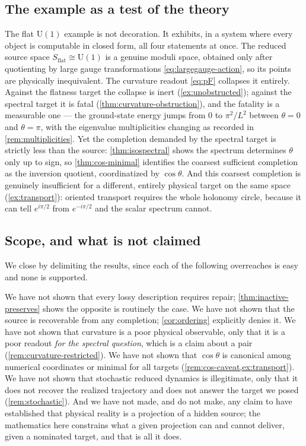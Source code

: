 \documentclass[11pt,reqno]{amsart}
\theoremstyle{plain}
\theoremstyle{definition}
\newcommand{\Uone}{\mathrm{U}(1)}
\newcommand{\Src}{S}
\begin{document}
\subsection{The example as a test of the theory}

The flat $\Uone$ example is not decoration. It exhibits, in a system where every object is
computable in closed form, all four statements at once. The reduced source space
$\Src_{\mathrm{flat}}\cong\Uone$ is a genuine moduli space, obtained only after quotienting by
large gauge transformations \eqref{eq:largegauge-action}, so its points are physically
inequivalent. The curvature readout \eqref{eq:pF} collapses it entirely. Against the flatness
target the collapse is inert (\cref{ex:unobstructed}); against the spectral target it is fatal
(\cref{thm:curvature-obstruction}), and the fatality is a measurable one --- the ground-state
energy jumps from $0$ to $\pi^2/L^2$ between $\theta=0$ and $\theta=\pi$, with the eigenvalue
multiplicities changing as recorded in \cref{rem:multiplicities}. Yet the completion demanded by
the spectral target is strictly less than the source: \cref{thm:isospectral} shows the spectrum
determines $\theta$ only up to sign, so \cref{thm:cos-minimal} identifies the coarsest sufficient
completion as the inversion quotient, coordinatized by $\cos\theta$. And this coarsest completion
is genuinely insufficient for a different, entirely physical target on the same space
(\cref{ex:transport}): oriented transport requires the whole holonomy circle, because it can tell
$e^{i\pi/2}$ from $e^{-i\pi/2}$ and the scalar spectrum cannot.

\subsection{Scope, and what is not claimed}

We close by delimiting the results, since each of the following overreaches is easy and none is
supported.

We have not shown that every lossy description requires repair; \cref{thm:inactive-preserves}
shows the opposite is routinely the case. We have not shown that the source is recoverable from
any completion; \cref{cor:ordering} explicitly denies it. We have not shown that curvature is a
poor physical observable, only that it is a poor readout \emph{for the spectral question}, which
is a claim about a pair (\cref{rem:curvature-restricted}). We have not shown that $\cos\theta$ is
canonical among numerical coordinates or minimal for all targets
(\cref{rem:cos-caveat,ex:transport}). We have not shown that stochastic reduced dynamics is
illegitimate, only that it does not recover the realized trajectory and does not answer the target
we posed (\cref{rem:stochastic}). And we have not made, and do not make, any claim to have
established that physical reality is a projection of a hidden source; the mathematics here
constrains what a given projection can and cannot deliver, given a nominated target, and that is
all it does.
\end{document}

